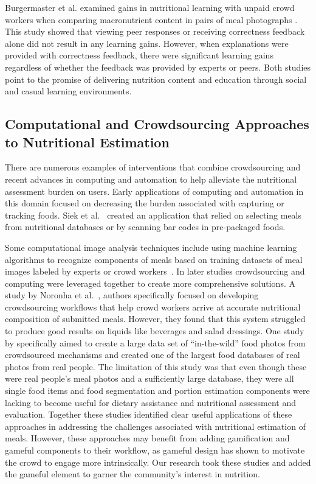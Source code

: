 Burgermaster et al. examined gains in nutritional learning with unpaid crowd workers when comparing macronutrient content in pairs of meal photographs \cite{burgermaster2017role}. This study showed that viewing peer responses or receiving correctness feedback alone did not result in any learning gains. However, when explanations were provided with correctness feedback, there were significant learning gains regardless of whether the feedback was provided by experts or peers. Both studies point to the promise of delivering nutrition content and education through social and casual learning environments. 

 
\vspace{-5pt}
\subsection{Computational and Crowdsourcing Approaches to Nutritional Estimation}

There are numerous examples of  interventions that combine crowdsourcing and recent advances in computing and automation to help alleviate the nutritional assessment burden on users. 
Early applications of computing and automation in this domain focused on decreasing the burden associated with capturing or tracking foods. Siek et al.~\cite{siek2006we} created an application that relied on selecting meals from nutritional databases or by scanning bar codes in pre-packaged foods. 

Some computational image analysis techniques include using machine learning algorithms to recognize components of meals based on training datasets of meal images labeled by experts or crowd workers~\cite{anthimopoulos2015computer,pouladzadeh2016food,rhyner2016carbohydrate,Thomaz:2013:FIE:2526667.2526672}. 
In later studies crowdsourcing and computing were leveraged together to create more comprehensive solutions. A study by Noronha et al.~\cite{noronha2011platemate}, authors specifically focused on developing crowdsourcing workflows that help crowd workers arrive at accurate nutritional composition of submitted meals. However, they found that this system struggled to produce good results on liquids like beverages and salad dressings. One study by \cite{merler2016snap} specifically aimed to create a large data set of ``in-the-wild'' food photos from crowdsourced mechanisms and created one of the largest food databases of real photos from real people. The limitation of this study was that even though these were real people's meal photos and a sufficiently large database, they were all single food items and food segmentation and portion estimation components were lacking to become useful for dietary assistance and nutritional assessment and evaluation. Together these studies identified clear useful applications of these approaches in addressing the challenges associated with nutritional estimation of meals. However, these approaches may benefit from adding gamification and gameful components to their workflow, as gameful design has shown to motivate the crowd to engage more intrinsically. Our research took these studies and added the gameful element to garner the community's interest in nutrition. 



